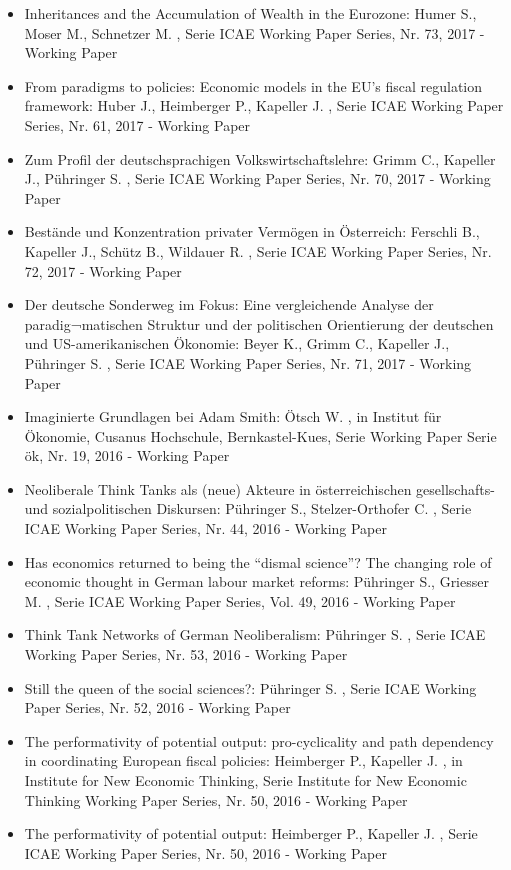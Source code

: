 \begin{itemize}
\item Inheritances and the Accumulation of Wealth in the Eurozone: Humer S., Moser M., Schnetzer M. , Serie ICAE Working Paper Series, Nr. 73, 2017 - Working Paper
\item From paradigms to policies: Economic models in the EU’s fiscal regulation framework: Huber J., Heimberger P., Kapeller J. , Serie ICAE Working Paper Series, Nr. 61, 2017 - Working Paper
\item Zum Profil der deutschsprachigen Volkswirtschaftslehre: Grimm C., Kapeller J., Pühringer S. , Serie ICAE Working Paper Series, Nr. 70, 2017 - Working Paper
\item Bestände und Konzentration privater Vermögen in Österreich: Ferschli B., Kapeller J., Schütz B., Wildauer R. , Serie ICAE Working Paper Series, Nr. 72, 2017 - Working Paper
\item Der deutsche Sonderweg im Fokus: Eine vergleichende Analyse der paradig¬matischen Struktur und der politischen Orientierung der deutschen und US-amerikanischen Ökonomie: Beyer K., Grimm C., Kapeller J., Pühringer S. , Serie ICAE Working Paper Series, Nr. 71, 2017 - Working Paper
\item Imaginierte Grundlagen bei Adam Smith: Ötsch W. , in Institut für Ökonomie, Cusanus Hochschule, Bernkastel-Kues, Serie Working Paper Serie ök, Nr. 19, 2016 - Working Paper
\item Neoliberale Think Tanks als (neue) Akteure in österreichischen gesellschafts- und sozialpolitischen Diskursen: Pühringer S., Stelzer-Orthofer C. , Serie ICAE Working Paper Series, Nr. 44, 2016 - Working Paper
\item Has economics returned to being the “dismal science”? The changing role of economic thought in German labour market reforms: Pühringer S., Griesser M. , Serie ICAE Working Paper Series, Vol. 49, 2016 - Working Paper
\item Think Tank Networks of German Neoliberalism: Pühringer S. , Serie ICAE Working Paper Series, Nr. 53, 2016 - Working Paper
\item Still the queen of the social sciences?: Pühringer S. , Serie ICAE Working Paper Series, Nr. 52, 2016 - Working Paper
\item The performativity of potential output: pro-cyclicality and path dependency in coordinating European fiscal policies: Heimberger P., Kapeller J. , in Institute for New Economic Thinking, Serie Institute for New Economic Thinking  Working Paper Series, Nr. 50, 2016 - Working Paper
\item The performativity of potential output: Heimberger P., Kapeller J. , Serie ICAE Working Paper Series, Nr. 50, 2016 - Working Paper

\end{itemize}
